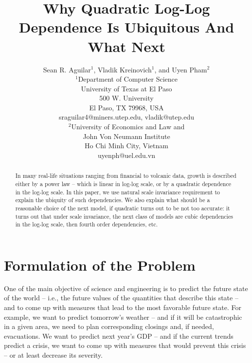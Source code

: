 \documentclass{article}
\begin{document}
\title{Why Quadratic Log-Log Dependence Is Ubiquitous And What Next}
\author{Sean R. Aguilar$^1$, Vladik Kreinovich$^1$, and Uyen Pham$^2$\\
$^1$Department of Computer Science\\ University of Texas at El
Paso\\500 W. University\\ El Paso, TX 79968,
USA\\sraguilar4@miners.utep.edu, vladik@utep.edu\\ $^2$University
of Economics and Law and\\John Von Neumann Institute\\Ho Chi Minh
City, Vietnam\\uyenph@uel.edu.vn}

\date{}
\maketitle

\begin{abstract}
In many real-life situations ranging from financial to volcanic data,
growth is described either by a power law -- which is linear in log-log scale, or by
a quadratic dependence in the log-log scale. In this paper, we use natural scale invariance
requirement to explain the ubiquity of such dependencies. We also explain what should be a
reasonable choice of the next model, if quadratic turns out to be not too accurate: it turns out that
under scale invariance, the next class of models are cubic dependencies in the log-log scale, then
fourth order dependencies, etc.
\end{abstract}

\section{Formulation of the Problem}

 One of the main objective of science and
engineering is to predict the future state of the world -- i.e., the future values of the
quantities that describe this state -- and to come up with measures that lead to the most
favorable future state. For example, we want to predict tomorrow's weather -- and if it will
be catastrophic in a given area, we need to plan corresponding closings and, if needed, evacuations.
We want to predict next year's GDP -- and if the current trends predict a crisis, we want to come
up with measures that would prevent this crisis -- or at least decrease its severity.
\end{document}
